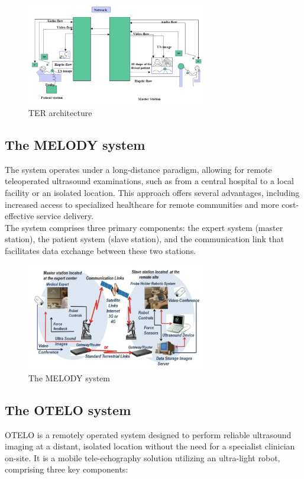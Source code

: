 \documentclass{article}
\begin{document}
\begin{figure}[h]
    \centering
    \includegraphics[width=0.7\textwidth]{TER.png}  
    \caption{TER architecture}
    \label{fig:ter}
\end{figure}


\subsection{The MELODY system}
The system operates under a long-distance paradigm, allowing for remote teleoperated ultrasound examinations, such as from a central hospital to a local facility or an isolated location. This approach offers several advantages, including increased access to specialized healthcare for remote communities and more cost-effective service delivery.
\\The system comprises three primary components: the expert system (master station), the patient system (slave station), and the communication link that facilitates data exchange between these two stations.

\begin{figure}[h]
    \centering
    \includegraphics[width=0.7\textwidth]{MELODY.png}  
    \caption{The MELODY system}
    \label{fig:melody}
\end{figure}

\subsection{The OTELO system}
OTELO is a remotely operated system designed to perform reliable ultrasound imaging at a distant, isolated location without the need for a specialist clinician on-site. It is a mobile tele-echography solution utilizing an ultra-light robot, comprising three key components:
\end{document}
